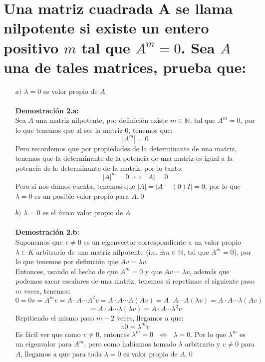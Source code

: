 \section{ Una matriz cuadrada A se llama \textbf{nilpotente} si existe un entero positivo $m$ tal que $A^m = 0$. Sea $A$ una de tales matrices, prueba que:}
\begin{itemize}
    \item [$a)$]$\lambda = 0$ es valor propio de $A$\\\\
\textbf{Demostraci\'on 2.a:}\\
Sea $A$ una matriz nilpotente, por definici\'on  existe $m\in\mathbb{N}$, tal que $A^m =0$, por lo que tenemos que al ser la matriz $0$, tenemos que:
\[|A^m|=0\]
Pero recordemos que por propiedades de la determinante de una matriz, tenemos que la determinante de la potencia de una matriz es igual a la potencia de la determinante de la matriz, por lo tanto:
\[|A|^m=0~~\Longleftrightarrow~~|A|=0\]
Pero si nos damos cuenta, tenemos que $|A|=|A-(0)I|=0$, por lo que $\lambda=0$ es un posible valor propio para $A$.\qed

\item [$b)$]$\lambda = 0$ es el \'unico valor propio de $A$\\\\
\textbf{Demostraci\'on 2.b:}\\
Suponemos que $v\neq 0$ es un eigenvector correspondiente a un valor propio $\lambda\in K$ arbitrario de una matriz nilpotente (i.e. $\exists m\in\mathbb{N}$, tal que $A^m =0$), por lo que tenemos por definici\'on que $Av=\lambda v$. \\
Entonces, usando el hecho de que $A^m=0$  y que $Av=\lambda v$, adem\'as que podemos sacar escalares de una matriz, tenemos si repetimos el siguiente paso $m$ veces, tenemos:
\[0=0v=A^mv=A\cdot A\cdots A^2v=A\cdot A\cdots A(Av)=A\cdot A\cdots A(\lambda v)=A\cdot A\cdots \lambda(A v)\]\[=A\cdot A\cdots \lambda(\lambda v)=A\cdot A\cdots\lambda^2v\]
Repitiendo el mismo paso $m-2$ veces, llegamos a que:
\[\therefore 0=\lambda^m v\]
Es f\'acil ver que como $v\neq 0$, entonces $\lambda^m=0~~~\Longleftrightarrow~~~\lambda=0$. Por lo que $\lambda^m$ es un eigenvalor para $A^m$, pero como hab\'iamos tomado $\lambda$ arbitrario y $v\neq0$ para $A$, llegamos a que para toda $\lambda=0$ es valor propio de $A$.\qed






\end{itemize}






